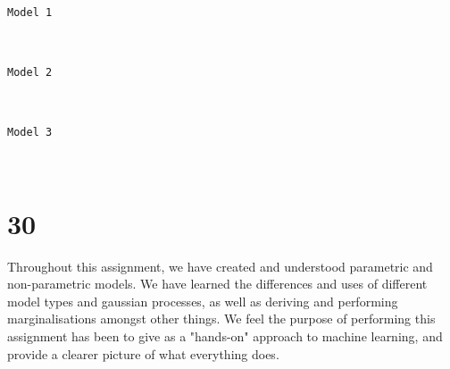 \documentclass[11pt]{article}
\begin{document}
    \begin{Verbatim}[commandchars=\\\{\}]
Model 1

    \end{Verbatim}

    \begin{center}
    \end{center}
    { \hspace*{\fill} \\}
    
    \begin{Verbatim}[commandchars=\\\{\}]
Model 2

    \end{Verbatim}

    \begin{center}
    \end{center}
    { \hspace*{\fill} \\}
    
    \begin{Verbatim}[commandchars=\\\{\}]
Model 3

    \end{Verbatim}

    \begin{center}
    \end{center}
    { \hspace*{\fill} \\}
    
    \section*{30}\label{section}

Throughout this assignment, we have created and understood parametric
and non-parametric models. We have learned the differences and uses of
different model types and gaussian processes, as well as deriving and
performing marginalisations amongst other things. We feel the purpose of
performing this assignment has been to give as a "hands-on" approach to
machine learning, and provide a clearer picture of what everything does.


    
    
    
    
\end{document}

